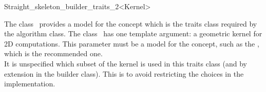 

\begin{ccRefClass}{Straight_skeleton_builder_traits_2<Kernel>}


\ccDefinition

The class \ccRefName\ provides a model for the
 concept which is the traits class
required by the  algorithm class. The class 
\ccRefName\ has one template argument: a geometric kernel for 2D computations. This parameter must be a model for the  concept, such as the , which is the recommended one.\\
It is unspecified which subset of the kernel is used in this traits class (and by extension in the builder class). This is to avoid restricting the choices in the implementation.


\ccIsModel
{}\\
\\
\\

\ccSeeAlso
{}

\end{ccRefClass}


